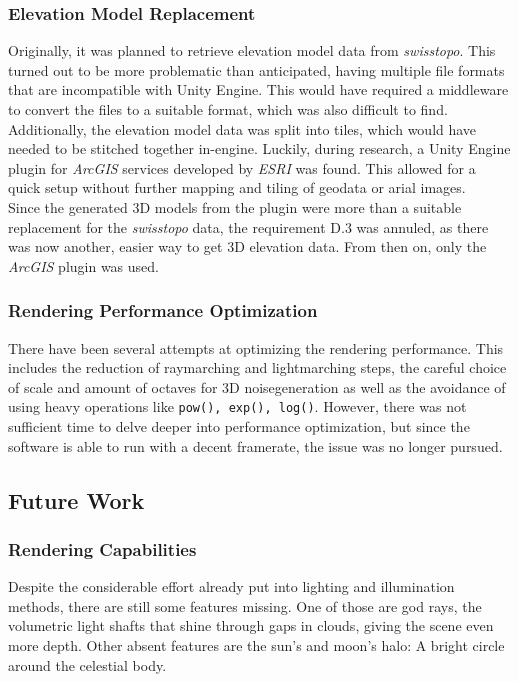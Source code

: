 \subsubsection{Elevation Model Replacement}
\label{section:project:swisstoporeplacement}
Originally, it was planned to retrieve elevation model data from \emph{swisstopo}. This turned out to be more problematic than anticipated, having multiple file formats that are incompatible with Unity Engine.
This would have required a middleware to convert the files to a suitable format, which was also difficult to find.
Additionally, the elevation model data was split into tiles, which would have needed to be stitched together in-engine.
\emptyline
Luckily, during research, a Unity Engine plugin for \emph{ArcGIS} services developed by \emph{ESRI} was found.
This allowed for a quick setup without further mapping and tiling of geodata or arial images.
\\
Since the generated 3D models from the plugin were more than a suitable replacement for the \emph{swisstopo} data, the requirement D.3 was annuled, as there was now another, easier way to get 3D elevation data.
From then on, only the \emph{ArcGIS} plugin was used.

\subsubsection{Rendering Performance Optimization}


There have been several attempts at optimizing the rendering performance.
This includes the reduction of \gls{raymarching} and \gls{lightmarching} steps, the careful choice of scale and amount of octaves for 3D \gls{noisegeneration} as well as the avoidance of using heavy operations like \lstinline[language=HLSL]{pow(), exp(), log()}.
However, there was not sufficient time to delve deeper into performance optimization, but since the software is able to run with a decent \gls{framerate}, the issue was no longer pursued.

\subsection{Future Work}
\label{section:project:futurework}
\subsubsection{Rendering Capabilities}
Despite the considerable effort already put into lighting and illumination methods, there are still some features missing.
One of those are god rays, the volumetric light shafts that shine through gaps in clouds, giving the scene even more depth.
Other absent features are the sun's and moon's halo: A bright circle around the celestial body.

